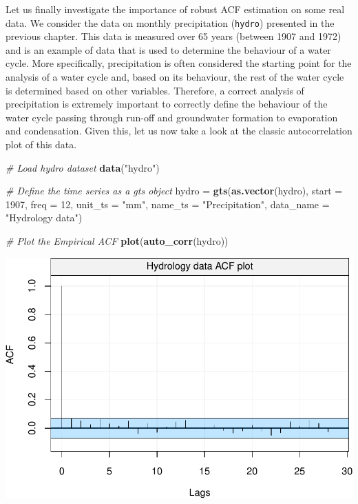 \documentclass[]{book}
\newenvironment{Shaded}{\begin{snugshade}}{\end{snugshade}}
\newcommand{\KeywordTok}[1]{\textcolor[rgb]{0.13,0.29,0.53}{\textbf{#1}}}
\newcommand{\DataTypeTok}[1]{\textcolor[rgb]{0.13,0.29,0.53}{#1}}
\newcommand{\DecValTok}[1]{\textcolor[rgb]{0.00,0.00,0.81}{#1}}
\newcommand{\StringTok}[1]{\textcolor[rgb]{0.31,0.60,0.02}{#1}}
\newcommand{\CommentTok}[1]{\textcolor[rgb]{0.56,0.35,0.01}{\textit{#1}}}
\newcommand{\NormalTok}[1]{#1}
\theoremstyle{definition}
\theoremstyle{definition}
\theoremstyle{definition}
\theoremstyle{remark}
\begin{document}
Let us finally investigate the importance of robust ACF estimation on
some real data. We consider the data on monthly precipitation
(\texttt{hydro}) presented in the previous chapter. This data is
measured over 65 years (between 1907 and 1972) and is an example of data
that is used to determine the behaviour of a water cycle. More
specifically, precipitation is often considered the starting point for
the analysis of a water cycle and, based on its behaviour, the rest of
the water cycle is determined based on other variables. Therefore, a
correct analysis of precipitation is extremely important to correctly
define the behaviour of the water cycle passing through run-off and
groundwater formation to evaporation and condensation. Given this, let
us now take a look at the classic autocorrelation plot of this data.

\begin{Shaded}
\begin{Highlighting}[]
\CommentTok{# Load hydro dataset}
\KeywordTok{data}\NormalTok{(}\StringTok{"hydro"}\NormalTok{)}

\CommentTok{# Define the time series as a gts object}
\NormalTok{hydro =}\StringTok{ }\KeywordTok{gts}\NormalTok{(}\KeywordTok{as.vector}\NormalTok{(hydro), }\DataTypeTok{start =} \DecValTok{1907}\NormalTok{, }\DataTypeTok{freq =} \DecValTok{12}\NormalTok{, }\DataTypeTok{unit_ts =} \StringTok{"mm"}\NormalTok{, }\DataTypeTok{name_ts =} \StringTok{"Precipitation"}\NormalTok{, }\DataTypeTok{data_name =} \StringTok{"Hydrology data"}\NormalTok{)}

\CommentTok{# Plot the Empirical ACF}
\KeywordTok{plot}\NormalTok{(}\KeywordTok{auto_corr}\NormalTok{(hydro))}
\end{Highlighting}
\end{Shaded}

\includegraphics{ts_files/figure-latex/unnamed-chunk-23-1.pdf}
\end{document}
